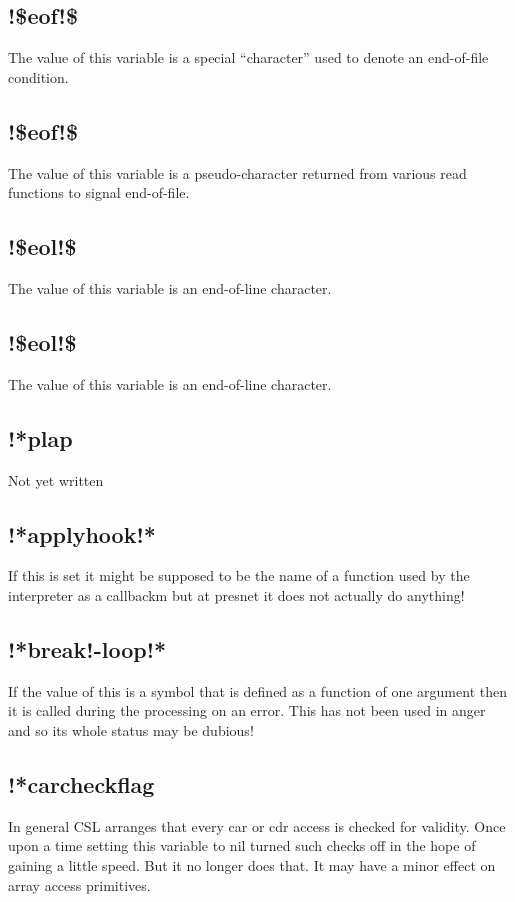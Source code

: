 \documentclass[a4paper,11pt]{article}
\begin{document}
\subsection{\ttfamily !\$eof!\$}
The value of this variable is a special ``character'' used to denote an
end-of-file condition.
  

\subsection{\ttfamily !\$eof!\$}
The value of this variable is a pseudo-character returned from various
read functions to signal end-of-file.

\subsection{\ttfamily !\$eol!\$}
The value of this variable is an end-of-line character.

\subsection{\ttfamily !\$eol!\$}
The value of this variable is an end-of-line character.

\subsection{\ttfamily !*plap}
Not yet written

\subsection{\ttfamily !*applyhook!*}
If this is set it might be supposed to be the name of a function used
by the interpreter as a callbackm but at presnet it does not actually do
anything!

\subsection{\ttfamily !*break!-loop!*}
If the value of this is a symbol that is defined as a function of one
argument then it is called during the processing on an error. This has not
been used in anger and so its whole status may be dubious!

\subsection{\ttfamily !*carcheckflag}
In general CSL arranges that every {\ttfamily car} or {\ttfamily cdr} access
is checked for validity. Once upon a time setting this variable to nil
turned such checks off in the hope of gaining a little speed. But it no
longer does that. It may have a minor effect on array access primitives.
\end{document}
